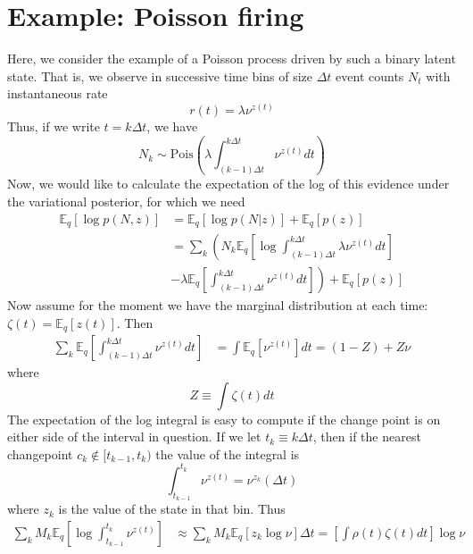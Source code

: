 \documentclass[11pt]{article}
\begin{document}
\section{Example: Poisson firing}
Here, we consider the example of a Poisson process driven by such a binary latent state. That is, we observe in successive time bins of size $\Delta t$ event counts $N_t$ with instantaneous rate
\begin{equation}
    r(t) = \lambda \nu^{z(t)}
\end{equation}
Thus, if we write $t = k\Delta t$, we have
\begin{equation}
    N_k \sim \text{Pois}\left(\lambda \int_{(k - 1)\Delta t}^{k\Delta t} \nu^{z(t)} dt\right)
\end{equation}
Now, we would like to calculate the expectation of the log of this evidence under the variational posterior, for which we need
\begin{align}
    \mathbb{E}_q[\log p(N, z)] &= \mathbb{E}_q[\log p(N|z)] + \mathbb{E}_q[p(z)] \\
    &= \sum_k \left(N_k \mathbb{E}_q \left[ \log \int_{(k - 1)\Delta t}^{k\Delta t} \lambda \nu^{z(t)} dt \right] \right. \\
    &- \left.\lambda \mathbb{E}_q\left[ \int_{(k - 1)\Delta t}^{k\Delta t} \nu^{z(t)} dt\right]\right)
    + \mathbb{E}_q[p(z)]
\end{align}
Now assume for the moment we have the marginal distribution at each time: $\zeta(t) = \mathbb{E}_q[z(t)]$. Then
\begin{align}
    \sum_k \mathbb{E}_q\left[ \int_{(k - 1)\Delta t}^{k\Delta t} \nu^{z(t)} dt\right] &= \int \mathbb{E}_q \left[\nu^{z(t)}\right] dt = (1 - Z) + Z\nu
\end{align}
where
\begin{equation}
    Z \equiv \int \zeta(t) dt
\end{equation}
The expectation of the log integral is easy to compute if the change point is on either side of the interval in question. If we let $t_k \equiv k \Delta t$, then if the nearest changepoint $c_k \notin [t_{k -1}, t_k)$ the value of the integral is
\begin{equation}
    \int_{t_{k - 1}}^{t_k} \nu^{z(t)} = \nu^{z_k}(\Delta t)
\end{equation}
where $z_k$ is the value of the state in that bin. Thus
\begin{align}
    \sum_k M_k \mathbb{E}_q \left[
    \log \int_{t_{k - 1}}^{t_k} \nu^{z(t)}
    \right]
    &\approx \sum_k M_k \mathbb{E}_q \left[z_k \log \nu \right] \Delta t = \left[\int \rho(t) \zeta(t) dt \right] \log \nu
\end{align}
\end{document}
